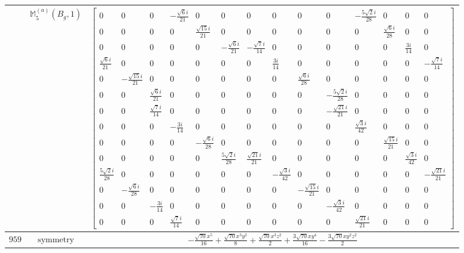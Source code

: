 \documentclass[fleqn,8pt,landscape]{jsarticle}
\begin{document}
\begin{longtable}{ccc}
$  $ & $ \mathbb{M}_{5}^{(a)}(B_{g},1) $ & $ \begin{bmatrix} 0 & 0 & 0 & - \frac{\sqrt{6} i}{21} & 0 & 0 & 0 & 0 & 0 & 0 & - \frac{5 \sqrt{2} i}{28} & 0 & 0 & 0 \\ 0 & 0 & 0 & 0 & \frac{\sqrt{15} i}{21} & 0 & 0 & 0 & 0 & 0 & 0 & \frac{\sqrt{6} i}{28} & 0 & 0 \\ 0 & 0 & 0 & 0 & 0 & - \frac{\sqrt{6} i}{21} & - \frac{\sqrt{7} i}{14} & 0 & 0 & 0 & 0 & 0 & \frac{3 i}{14} & 0 \\ \frac{\sqrt{6} i}{21} & 0 & 0 & 0 & 0 & 0 & 0 & \frac{3 i}{14} & 0 & 0 & 0 & 0 & 0 & - \frac{\sqrt{7} i}{14} \\ 0 & - \frac{\sqrt{15} i}{21} & 0 & 0 & 0 & 0 & 0 & 0 & \frac{\sqrt{6} i}{28} & 0 & 0 & 0 & 0 & 0 \\ 0 & 0 & \frac{\sqrt{6} i}{21} & 0 & 0 & 0 & 0 & 0 & 0 & - \frac{5 \sqrt{2} i}{28} & 0 & 0 & 0 & 0 \\ 0 & 0 & \frac{\sqrt{7} i}{14} & 0 & 0 & 0 & 0 & 0 & 0 & - \frac{\sqrt{21} i}{21} & 0 & 0 & 0 & 0 \\ 0 & 0 & 0 & - \frac{3 i}{14} & 0 & 0 & 0 & 0 & 0 & 0 & \frac{\sqrt{3} i}{42} & 0 & 0 & 0 \\ 0 & 0 & 0 & 0 & - \frac{\sqrt{6} i}{28} & 0 & 0 & 0 & 0 & 0 & 0 & \frac{\sqrt{15} i}{21} & 0 & 0 \\ 0 & 0 & 0 & 0 & 0 & \frac{5 \sqrt{2} i}{28} & \frac{\sqrt{21} i}{21} & 0 & 0 & 0 & 0 & 0 & \frac{\sqrt{3} i}{42} & 0 \\ \frac{5 \sqrt{2} i}{28} & 0 & 0 & 0 & 0 & 0 & 0 & - \frac{\sqrt{3} i}{42} & 0 & 0 & 0 & 0 & 0 & - \frac{\sqrt{21} i}{21} \\ 0 & - \frac{\sqrt{6} i}{28} & 0 & 0 & 0 & 0 & 0 & 0 & - \frac{\sqrt{15} i}{21} & 0 & 0 & 0 & 0 & 0 \\ 0 & 0 & - \frac{3 i}{14} & 0 & 0 & 0 & 0 & 0 & 0 & - \frac{\sqrt{3} i}{42} & 0 & 0 & 0 & 0 \\ 0 & 0 & 0 & \frac{\sqrt{7} i}{14} & 0 & 0 & 0 & 0 & 0 & 0 & \frac{\sqrt{21} i}{21} & 0 & 0 & 0 \end{bmatrix} $ \\ \hline
$ 959 $ & $ \text{symmetry} $ & $ - \frac{\sqrt{70} x^{5}}{16} + \frac{\sqrt{70} x^{3} y^{2}}{8} + \frac{\sqrt{70} x^{3} z^{2}}{2} + \frac{3 \sqrt{70} x y^{4}}{16} - \frac{3 \sqrt{70} x y^{2} z^{2}}{2} $ \\

\end{longtable}
\end{document}
